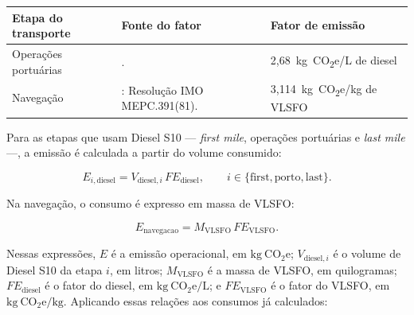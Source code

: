 \documentclass[brazil,]{article}
\begin{document}
\begin{longtable}[]{@{}lll@{}}
\toprule
\begin{minipage}[b]{0.30\columnwidth}\raggedright
Etapa do transporte\strut
\end{minipage} & \begin{minipage}[b]{0.30\columnwidth}\raggedright
Fonte do fator\strut
\end{minipage} & \begin{minipage}[b]{0.30\columnwidth}\raggedright
Fator de emissão\strut
\end{minipage}\tabularnewline
\midrule
\endhead
\begin{minipage}[t]{0.30\columnwidth}\raggedright
Operações portuárias\strut
\end{minipage} & \begin{minipage}[t]{0.30\columnwidth}\raggedright
\textcite{ipcc2006}.\strut
\end{minipage} & \begin{minipage}[t]{0.30\columnwidth}\raggedright
2,68~kg~CO\textsubscript{2}e/L de diesel\strut
\end{minipage}\tabularnewline
\begin{minipage}[t]{0.30\columnwidth}\raggedright
Navegação\strut
\end{minipage} & \begin{minipage}[t]{0.30\columnwidth}\raggedright
\textcite{competitiveness2024}: Resolução IMO
MEPC.391(81).\strut
\end{minipage} & \begin{minipage}[t]{0.30\columnwidth}\raggedright
3,114~kg~CO\textsubscript{2}e/kg de VLSFO\strut
\end{minipage}\tabularnewline
\bottomrule
\end{longtable}

Para as etapas que usam Diesel S10 --- \emph{first mile}, operações
portuárias e \emph{last mile} ---, a emissão é calculada a partir do
volume consumido:

\[
E_{i,\mathrm{diesel}}
=V_{\mathrm{diesel},i}\,FE_{\mathrm{diesel}},
\qquad
i\in\{\mathrm{first},\mathrm{porto},\mathrm{last}\}.
\]

Na navegação, o consumo é expresso em massa de VLSFO:

\[
E_{\mathrm{navegacao}}
=M_{\mathrm{VLSFO}}\,FE_{\mathrm{VLSFO}}.
\]

Nessas expressões, \(E\) é a emissão operacional, em
\(\mathrm{kg\ CO_2e}\); \(V_{\mathrm{diesel},i}\) é o volume de Diesel
S10 da etapa \(i\), em litros; \(M_{\mathrm{VLSFO}}\) é a massa de
VLSFO, em quilogramas; \(FE_{\mathrm{diesel}}\) é o fator do diesel, em
\(\mathrm{kg\ CO_2e/L}\); e \(FE_{\mathrm{VLSFO}}\) é o fator do VLSFO,
em \(\mathrm{kg\ CO_2e/kg}\). Aplicando essas relações aos consumos já
calculados:
\end{document}
